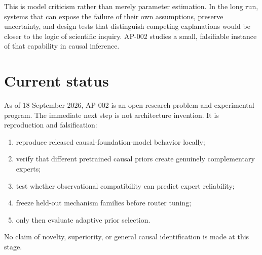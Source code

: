 \documentclass[11pt]{article}
\begin{document}
This is model criticism rather than merely parameter estimation. In the long run, systems that can expose the failure of their own assumptions, preserve uncertainty, and design tests that distinguish competing explanations would be closer to the logic of scientific inquiry. AP-002 studies a small, falsifiable instance of that capability in causal inference.

\section{Current status}

As of 18 September 2026, AP-002 is an open research problem and experimental program. The immediate next step is not architecture invention. It is reproduction and falsification:

\begin{enumerate}
  \item reproduce released causal-foundation-model behavior locally;
  \item verify that different pretrained causal priors create genuinely complementary experts;
  \item test whether observational compatibility can predict expert reliability;
  \item freeze held-out mechanism families before router tuning;
  \item only then evaluate adaptive prior selection.
\end{enumerate}

No claim of novelty, superiority, or general causal identification is made at this stage.
\end{document}
